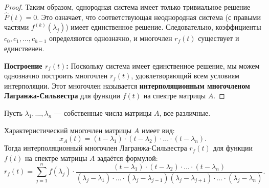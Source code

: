 \begin{proof}
Таким образом, однородная система имеет только тривиальное решение \( \hat{P}(t) = 0 \). Это означает, что соответствующая неоднородная система (с правыми частями \( f^{(k)}(\lambda_j) \)) имеет единственное решение. Следовательно, коэффициенты \( c_0, c_1, \ldots, c_{h-1} \) определяются однозначно, и многочлен \( r_f(t) \) существует и единственен.

\textbf{Построение \( r_f(t) \):}
Поскольку система имеет единственное решение, мы можем однозначно построить многочлен \( r_f(t) \), удовлетворяющий всем условиям интерполяции. Этот многочлен называется \textbf{интерполяционным многочленом Лагранжа-Сильвестра} для функции \( f(t) \) на спектре матрицы \( A \).

\end{proof}

\begin{shth}
    \begin{theorem}
    \leavevmode \nl 

    Пусть \( \lambda_{1}, \ldots, \lambda_{n} \) — собственные числа матрицы \( A \), все различные. 
    
    Характеристический многочлен матрицы \( A \) имеет вид:
    \[
    x_{A}(t) = (t - \lambda_{1}) \cdot (t - \lambda_{2}) \cdot \ldots \cdot (t - \lambda_{n}).
    \]
    Тогда интерполяционный многочлен Лагранжа-Сильвестра \( r_{f}(t) \) для функции \( f(t) \) на спектре матрицы \( A \) задаётся формулой:
    \[
    r_{f}(t) = \sum_{j = 1}^{n} f(\lambda_{j}) \cdot \frac{(t - \lambda_{1}) \cdot (t - \lambda_{2}) \cdot \ldots \cdot (t - \lambda_{n})}{(\lambda_{j} - \lambda_{1}) \cdot \ldots \cdot (\lambda_{j} - \lambda_{j-1}) (\lambda_{j} - \lambda_{j+1}) \cdot \ldots \cdot (\lambda_{j} - \lambda_{n})}.
    \]
    \end{theorem}
\end{shth}

